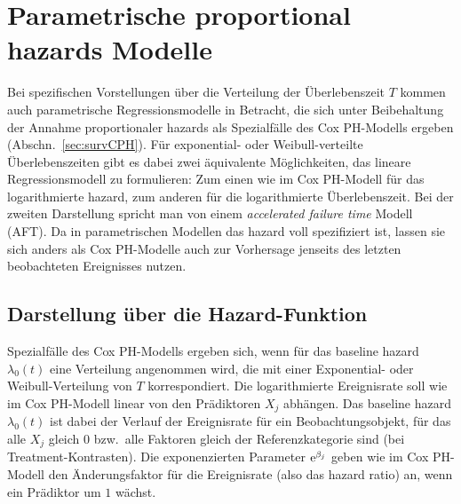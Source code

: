 \section{Parametrische proportional hazards Modelle}
\label{sec:survParam}

Bei spezifischen Vorstellungen über die Verteilung der Überlebenszeit $T$ kommen auch parametrische Regressionsmodelle in Betracht, die sich unter Beibehaltung der Annahme proportionaler hazards als Spezialfälle des Cox PH-Modells ergeben (Abschn.\ \ref{sec:survCPH}). Für exponential- oder Weibull-verteilte Überlebenszeiten gibt es dabei zwei äquivalente Möglichkeiten, das lineare Regressionsmodell zu formulieren: Zum einen wie im Cox PH-Modell für das logarithmierte hazard, zum anderen für die logarithmierte Überlebenszeit. Bei der zweiten Darstellung spricht man von einem \emph{accelerated failure time} Modell (AFT).  Da in parametrischen Modellen das hazard voll spezifiziert ist, lassen sie sich anders als Cox PH-Modelle auch zur Vorhersage jenseits des letzten beobachteten Ereignisses nutzen.

\subsection{Darstellung über die Hazard-Funktion}

Spezialfälle des Cox PH-Modells ergeben sich, wenn für das baseline hazard $\lambda_{0}(t)$ eine Verteilung angenommen wird, die mit einer Exponential- oder Weibull-Verteilung von $T$ korrespondiert. Die logarithmierte Ereignisrate soll wie im Cox PH-Modell linear von den Prädiktoren $X_{j}$ abhängen. Das baseline hazard $\lambda_{0}(t)$ ist dabei der Verlauf der Ereignisrate für ein Beobachtungsobjekt, für das alle $X_{j}$ gleich $0$ bzw.\ alle Faktoren gleich der Referenzkategorie sind (bei Treatment-Kontrasten). Die exponenzierten Parameter ${\mathrm{e}}^{\beta_{j}}$ geben wie im Cox PH-Modell den Änderungsfaktor für die Ereignisrate (also das hazard ratio) an, wenn ein Prädiktor um $1$ wächst.

